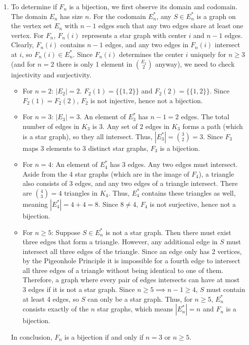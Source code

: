 \documentclass{article}
\begin{document}
\begin{enumerate}[label=\fbox{\arabic*}]
  \item %
        To determine if $F_n$ is a bijection, we first observe its domain and codomain. The domain $E_n$ has size $n$. For the codomain $E_n^*$, any $S \in E_n^*$ is a graph on the vertex set $E_n$ with $n-1$ edges such that any two edges share at least one vertex.
        For $F_n$, $F_n(i)$ represents a star graph with center $i$ and $n-1$ edges. Clearly, $F_n(i)$ contains $n-1$ edges, and any two edges in $F_n(i)$ intersect at $i$, so $F_n(i) \in E_n^*$.
        Since $F_n(i)$ determines the center $i$ uniquely for $n \ge 3$ (and for $n=2$ there is only 1 element in $\binom{E_2}{2}$ anyway), we need to check injectivity and surjectivity.
        \begin{itemize}
          \item For $n = 2$: $|E_2| = 2$. $F_2(1) = \{ \{1, 2\} \}$ and $F_2(2) = \{ \{1, 2\} \}$. Since $F_2(1) = F_2(2)$, $F_2$ is not injective, hence not a bijection.
          \item For $n = 3$: $|E_3| = 3$. An element of $E_3^*$ has $n-1=2$ edges. The total number of edges in $K_3$ is $3$. Any set of 2 edges in $K_3$ forms a path (which is a star graph), so they all intersect. Thus, $|E_3^*| = \binom{3}{2} = 3$. Since $F_3$ maps $3$ elements to $3$ distinct star graphs, $F_3$ is a bijection.
          \item For $n = 4$: An element of $E_4^*$ has $3$ edges. Any two edges must intersect. Aside from the 4 star graphs (which are in the image of $F_4$), a triangle also consists of 3 edges, and any two edges of a triangle intersect. There are $\binom{4}{3} = 4$ triangles in $K_4$. Thus, $E_4^*$ contains these triangles as well, meaning $|E_4^*| = 4 + 4 = 8$. Since $8 \neq 4$, $F_4$ is not surjective, hence not a bijection.
          \item For $n \ge 5$: Suppose $S \in E_n^*$ is not a star graph. Then there must exist three edges that form a triangle. However, any additional edge in $S$ must intersect all three edges of the triangle. Since an edge only has 2 vertices, by the Pigeonhole Principle it is impossible for a fourth edge to intersect all three edges of a triangle without being identical to one of them. Therefore, a graph where every pair of edges intersects can have at most $3$ edges if it is not a star graph. Since $n \ge 5 \implies n-1 \ge 4$, $S$ must contain at least 4 edges, so $S$ can only be a star graph.
          Thus, for $n \ge 5$, $E_n^*$ consists exactly of the $n$ star graphs, which means $|E_n^*| = n$ and $F_n$ is a bijection.
        \end{itemize}
        In conclusion, $F_n$ is a bijection if and only if $n = 3$ or $n \ge 5$.

\end{enumerate}
\end{document}
